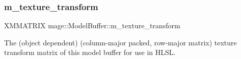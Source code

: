 \subsubsection{\texorpdfstring{m\+\_\+texture\+\_\+transform}{m\_texture\_transform}}
{\footnotesize\ttfamily X\+M\+M\+A\+T\+R\+IX mage\+::\+Model\+Buffer\+::m\+\_\+texture\+\_\+transform}

The (object dependent) (column-\/major packed, row-\/major matrix) texture transform matrix of this model buffer for use in H\+L\+SL. 